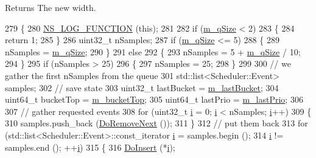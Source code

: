 \begin{DoxyReturn}{Returns}
The new width. 
\end{DoxyReturn}

\begin{DoxyCode}
279 \{
280   \hyperlink{log-macros-disabled_8h_a90b90d5bad1f39cb1b64923ea94c0761}{NS\_LOG\_FUNCTION} (\textcolor{keyword}{this});
281 
282   \textcolor{keywordflow}{if} (\hyperlink{classns3_1_1CalendarScheduler_a24148e8feac3c068ab31317aee8f46c2}{m\_qSize} < 2)
283     \{
284       \textcolor{keywordflow}{return} 1;
285     \}
286   uint32\_t nSamples;
287   \textcolor{keywordflow}{if} (\hyperlink{classns3_1_1CalendarScheduler_a24148e8feac3c068ab31317aee8f46c2}{m\_qSize} <= 5)
288     \{
289       nSamples = \hyperlink{classns3_1_1CalendarScheduler_a24148e8feac3c068ab31317aee8f46c2}{m\_qSize};
290     \}
291   \textcolor{keywordflow}{else}
292     \{
293       nSamples = 5 + \hyperlink{classns3_1_1CalendarScheduler_a24148e8feac3c068ab31317aee8f46c2}{m\_qSize} / 10;
294     \}
295   \textcolor{keywordflow}{if} (nSamples > 25)
296     \{
297       nSamples = 25;
298     \}
299 
300   \textcolor{comment}{// we gather the first nSamples from the queue}
301   std::list<Scheduler::Event> samples;
302   \textcolor{comment}{// save state}
303   uint32\_t lastBucket = \hyperlink{classns3_1_1CalendarScheduler_aac53aae4bda7758ba73e45bfe775fec0}{m\_lastBucket};
304   uint64\_t bucketTop = \hyperlink{classns3_1_1CalendarScheduler_a8a8746e4fc94345c5584629b78b25549}{m\_bucketTop};
305   uint64\_t lastPrio = \hyperlink{classns3_1_1CalendarScheduler_ac0e4ff83ceeb795f92af7a52d48ec41b}{m\_lastPrio};
306 
307   \textcolor{comment}{// gather requested events}
308   \textcolor{keywordflow}{for} (uint32\_t \hyperlink{bernuolliDistribution_8m_a6f6ccfcf58b31cb6412107d9d5281426}{i} = 0; \hyperlink{bernuolliDistribution_8m_a6f6ccfcf58b31cb6412107d9d5281426}{i} < nSamples; \hyperlink{bernuolliDistribution_8m_a6f6ccfcf58b31cb6412107d9d5281426}{i}++)
309     \{
310       samples.push\_back (\hyperlink{classns3_1_1CalendarScheduler_a42c114e7a4bb68943b63fa9dfc841610}{DoRemoveNext} ());
311     \}
312   \textcolor{comment}{// put them back}
313   \textcolor{keywordflow}{for} (std::list<Scheduler::Event>::const\_iterator \hyperlink{bernuolliDistribution_8m_a6f6ccfcf58b31cb6412107d9d5281426}{i} = samples.begin ();
314        \hyperlink{bernuolliDistribution_8m_a6f6ccfcf58b31cb6412107d9d5281426}{i} != samples.end (); ++\hyperlink{bernuolliDistribution_8m_a6f6ccfcf58b31cb6412107d9d5281426}{i})
315     \{
316       \hyperlink{classns3_1_1CalendarScheduler_a89cf4c06b7763187a0155320013cf1d1}{DoInsert} (*\hyperlink{bernuolliDistribution_8m_a6f6ccfcf58b31cb6412107d9d5281426}{i});

\end{DoxyCode}
